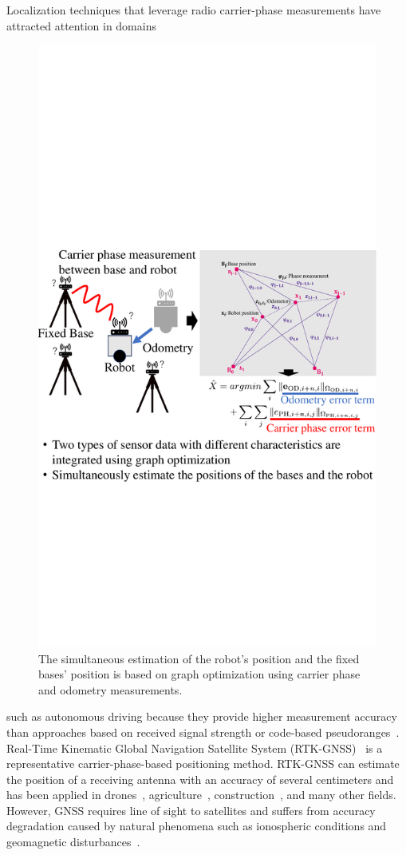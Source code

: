 \documentclass[conference]{IEEEtran}
\begin{document}
Localization techniques that leverage radio carrier-phase measurements have attracted attention in domains 
\begin{figure}[h!]
    \centering
    \includegraphics[width=0.9\linewidth]{figures/Fig1.pdf}
    \caption{The simultaneous estimation of the robot's position and the fixed bases' position is based on graph optimization using carrier phase and odometry measurements.}
    \label{fig:fig1}
\end{figure}
such as autonomous driving because they provide higher measurement accuracy than approaches based on received signal strength or code-based pseudoranges~\cite{gnss_autonomou_vehicles}.
Real-Time Kinematic Global Navigation Satellite System (RTK-GNSS)~\cite{RTK-GNSS} is a representative carrier-phase-based positioning method.
RTK-GNSS can estimate the position of a receiving antenna with an accuracy of several centimeters and has been applied in drones~\cite{RTK-M300}, agriculture~\cite{RTK-Agriculture}, construction~\cite{six-dump}, and many other fields.
However, GNSS requires line of sight to satellites and suffers from accuracy degradation caused by natural phenomena such as ionospheric conditions and geomagnetic disturbances~\cite{gnss_error}.
\end{document}
